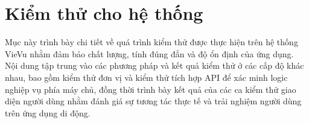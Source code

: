 \section{Kiểm thử cho hệ thống}

Mục này trình bày chi tiết về quá trình kiểm thử được thực hiện trên hệ thống VieVu nhằm đảm bảo chất lượng, tính đúng đắn và độ ổn định của ứng dụng. Nội dung tập trung vào các phương pháp và kết quả kiểm thử ở các cấp độ khác nhau, bao gồm kiểm thử đơn vị và kiểm thử tích hợp API để xác minh logic nghiệp vụ phía máy chủ, đồng thời trình bày kết quả của các ca kiểm thử giao diện người dùng nhằm đánh giá sự tương tác thực tế và trải nghiệm người dùng trên ứng dụng di động.


